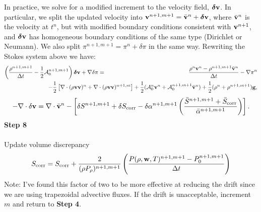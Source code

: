 \documentclass[final]{siamltex}
\def\gb {{\bf g}}
\def\vb {{\bf v}}
\def\wb {{\bf w}}
\def\deltab {\boldsymbol{\delta}}
\def\half   {\frac{1}{2}}
\begin{document}
{\color{red}
In practice, we solve for a modified increment to the velocity field, $\deltab\vb$.  In particular,
we split the updated velocity into
$\vb^{n+1,m+1} = \bar{\vb}^n + \deltab\vb$, where $\bar{\vb}^n$ is the velocity at $t^n$, but with modified boundary
conditions consistent with $\vb^{n+1}$, 
and $\deltab\vb$ has homogeneous boundary conditions of the same type 
(Dirichlet or Neumann).
We also split $\pi^{n+1,m+1} = \pi^n + \delta\pi$ in the same way.
Rewriting the Stokes system above we have:
\begin{eqnarray}
\left(\frac{\rho^{n+1,m+1}}{\Delta t} - \half\mathcal{A}_0^{n+1,m+1}\right)\deltab\vb + \nabla\delta\pi &=& \frac{\rho^n\vb^n - \rho^{n+1,m+1}\bar{\vb}^n}{\Delta t} - \nabla\pi^n\nonumber\\
&&\hspace{-1.5in} - \half\left[\nabla\cdot(\rho\vb\vb)^n + \nabla\cdot(\rho\vb\vb)^{n+1,m}\right] + \half(\mathcal{A}_0^n\vb^n+\mathcal{A}_0^{n+1,m+1}\bar{\vb}^n) + \half(\rho^n + \rho^{n+1,m+1})\gb,\nonumber\\
\end{eqnarray}
\begin{equation}
-\nabla\cdot\delta\vb = \nabla\cdot\bar{\vb}^n - \left[\delta S^{n+1,m+1} + \delta S_{\rm corr} - \delta\alpha^{n+1,m+1}\left(\frac{\bar{S}^{n+1,m+1} + \bar{S}_{\rm corr}}{\bar{\alpha}^{n+1,m+1}}\right)\right].
\end{equation}
}%
{\bf Step 8}\\ \\
Update volume discrepancy
\begin{equation}
S_{\rm corr} = S_{\rm corr} + \frac{2}{(\rho P_\rho)^{n+1,m+1}}\left(\frac{P(\rho,\wb,T)^{n+1,m+1} - P_0^{n+1,m+1}}{\Delta t}\right)
\end{equation}
Note: I've found this factor of two to be more effective at reducing the drift
since we are using trapezoidal advective fluxes.  If the drift is unacceptable,
increment $m$ and return to {\bf Step 4}.
\end{document}
